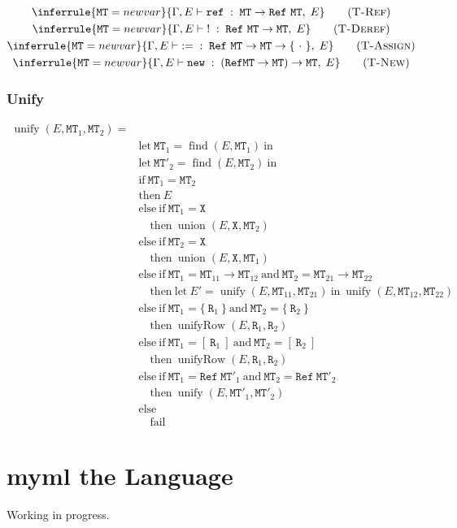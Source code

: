\documentclass{report}
\newcommand{\theLang}{myml}
\newcommand{\code}{\mathtt}
\newcommand{\ruleTag}[1]{\label{#1}\tag{\textsc{#1}}}
\DeclareMathOperator{\union}{union}
\DeclareMathOperator{\find}{find}
\DeclareMathOperator{\unify}{unify}
\DeclareMathOperator{\unifyRow}{unifyRow}
\newcommand{\newVariable}{newvar}
\newcommand{\entails}{\vdash}
\newcommand{\typingRelation}[5]{#1, #2 \entails #3 \;:\; #4 ,\; #5}
\begin{document}
\begin{gather}
\\
\inferrule
{\code{MT} = \newVariable}
{\typingRelation{\Gamma}{E}{\code{ref}}{\code{MT}\rightarrow\code{Ref}\ \code{MT}}{E}}
\ruleTag{T-Ref}
\\
\inferrule
{\code{MT} = \newVariable}
{\typingRelation{\Gamma}{E}{\code{!}}{\code{Ref}\ \code{MT}\rightarrow\code{MT}}{E}}
\ruleTag{T-Deref}
\\
\inferrule
{\code{MT} = \newVariable}
{\typingRelation{\Gamma}{E}{\code{:=}}{\code{Ref}\ \code{MT}\rightarrow\code{MT}\rightarrow\{\ \cdot\ \}}{E}}
\ruleTag{T-Assign}
\\
\inferrule
{\code{MT} = \newVariable}
{\typingRelation{\Gamma}{E}{\code{new}}{(\code{Ref} \code{MT}\rightarrow\code{MT})\rightarrow\code{MT}}{E}}
\ruleTag{T-New}
\end{gather}

\subsection{Unify}

\begin{align*}
\unify(E, \code{MT}_1, \code{MT}_2) = \\
& \text{let}\ \code{MT}_1 = \find(E, \code{MT}_1)\ \text{in} \\
& \text{let}\ \code{MT}'_2 = \find(E, \code{MT}_2)\ \text{in} \\
& \text{if}\ \code{MT}_1 = \code{MT}_2 \\
& \text{then}\ E \\
& \text{else}\ \text{if}\ \code{MT}_1 = \code{X} \\
& \quad \text{then}\ \union(E, \code{X}, \code{MT}_2) \\
& \text{else}\ \text{if}\ \code{MT}_2 = \code{X} \\
& \quad \text{then}\ \union(E, \code{X}, \code{MT}_1) \\
& \text{else}\ \text{if}\ \code{MT}_1 = \code{MT}_{11}\rightarrow\code{MT}_{12}\ \text{and}\ \code{MT}_2 = \code{MT}_{21}\rightarrow\code{MT}_{22} \\
& \quad \text{then}\ \text{let}\ E' = \unify(E, \code{MT}_{11}, \code{MT}_{21})\ \text{in}\ \unify(E, \code{MT}_{12}, \code{MT}_{22}) \\
& \text{else}\ \text{if}\ \code{MT}_1 = \{\ \code{R}_1\ \}\ \text{and}\ \code{MT}_2 = \{\ \code{R}_2\ \} \\
& \quad \text{then}\ \unifyRow(E, \code{R}_1, \code{R}_2) \\
& \text{else}\ \text{if}\ \code{MT}_1 = [\ \code{R}_1\ ]\ \text{and}\ \code{MT}_2 = [\ \code{R}_2\ ] \\
& \quad \text{then}\ \unifyRow(E, \code{R}_1, \code{R}_2) \\
& \text{else}\ \text{if}\ \code{MT}_1 = \code{Ref}\ \code{MT}'_1\ \text{and}\ \code{MT}_2 = \code{Ref}\ \code{MT}'_2 \\
& \quad\text{then}\ \unify(E, \code{MT}'_1, \code{MT}'_2) \\
& \text{else} \\
& \quad \text{fail}
\end{align*}

\chapter{\theLang{} the Language}

Working in progress.
\end{document}
